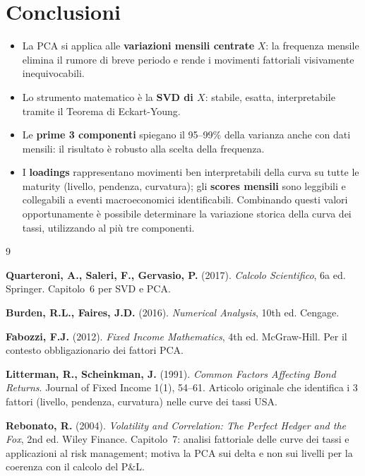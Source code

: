 \documentclass[11pt,a4paper]{article}
\theoremstyle{plain}
\theoremstyle{definition}
\theoremstyle{remark}
\begin{document}
\section{Conclusioni}

\begin{itemize}
  \item La PCA si applica alle \textbf{variazioni mensili centrate} $X$: la
        frequenza mensile elimina il rumore di breve periodo e rende i
        movimenti fattoriali visivamente inequivocabili.
  \item Lo strumento matematico è la \textbf{SVD di $X$}: stabile, esatta,
        interpretabile tramite il Teorema di Eckart-Young.
  \item Le \textbf{prime 3 componenti} spiegano il 95--99\% della varianza
        anche con dati mensili: il risultato è robusto alla scelta della
        frequenza.
  \item I \textbf{loadings} rappresentano movimenti ben interpretabili della curva su tutte le maturity (livello, pendenza, curvatura); gli \textbf{scores mensili} sono leggibili e
        collegabili a eventi macroeconomici identificabili. Combinando questi valori opportunamente è possibile determinare la variazione storica della curva dei tassi, utilizzando al più tre componenti.
\end{itemize}

\renewcommand{\refname}{Riferimenti bibliografici}
\begin{thebibliography}{9}

  \textbf{Quarteroni, A., Saleri, F., Gervasio, P.} (2017).
  \textit{Calcolo Scientifico}, 6a ed. Springer.
  Capitolo~6 per SVD e PCA.

  \textbf{Burden, R.L., Faires, J.D.} (2016).
  \textit{Numerical Analysis}, 10th ed. Cengage.

  \textbf{Fabozzi, F.J.} (2012).
  \textit{Fixed Income Mathematics}, 4th ed. McGraw-Hill.
  Per il contesto obbligazionario dei fattori PCA.

  \textbf{Litterman, R., Scheinkman, J.} (1991).
  \textit{Common Factors Affecting Bond Returns}.
  Journal of Fixed Income 1(1), 54--61.
  Articolo originale che identifica i 3 fattori (livello, pendenza, curvatura)
  nelle curve dei tassi USA.

  \textbf{Rebonato, R.} (2004).
  \textit{Volatility and Correlation: The Perfect Hedger and the Fox},
  2nd ed. Wiley Finance.
  Capitolo~7: analisi fattoriale delle curve dei tassi e applicazioni al
  risk management; motiva la PCA sui delta e non sui livelli per la
  coerenza con il calcolo del P\&L.

\end{thebibliography}
\end{document}

